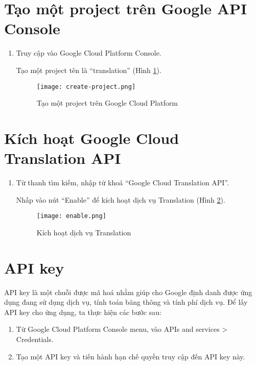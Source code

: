 \documentclass[../thesis.tex]{subfiles}
\begin{document}
\section{Tạo một project trên Google API Console}

\begin{enumerate}
	\item Truy cập vào Google Cloud Platform Console.
	\begin{item}
	Tạo một project tên là ``translation'' (Hình \ref{Tao mot project tren Google Cloud Platform}).
	\begin{figure}
		\texttt{[image: create-project.png]}
		\caption{Tạo một project trên Google Cloud Platform}
		\label{Tao mot project tren Google Cloud Platform}
	\end{figure}
	\end{item}
\end{enumerate}

\section{Kích hoạt Google Cloud Translation API}
\begin{enumerate}
	\item Từ thanh tìm kiếm, nhập từ khoá ``Google Cloud Translation API''.
	\begin{item}
	Nhấp vào nút ``Enable'' để kích hoạt dịch vụ Translation (Hình \ref{Kich hoat dich vu Translation}).
	\begin{figure}[h]
		\texttt{[image: enable.png]}
		\caption{Kích hoạt dịch vụ Translation}
		\label{Kich hoat dich vu Translation}
	\end{figure}
	\end{item}
\end{enumerate}

\section{API key}

API key là một chuỗi được mã hoá nhằm giúp cho Google định danh được ứng dụng đang sử dụng dịch vụ, tính toán băng thông và tính phí dịch vụ. Để lấy API key cho ứng dụng, ta thực hiện các bước sau:

\begin{enumerate}
	\item Từ Google Cloud Platform Console menu, vào APIs and services > Credentials.
	\item Tạo một API key và tiến hành hạn chế quyền truy cập đến API key này.
\end{enumerate}
\end{document}
